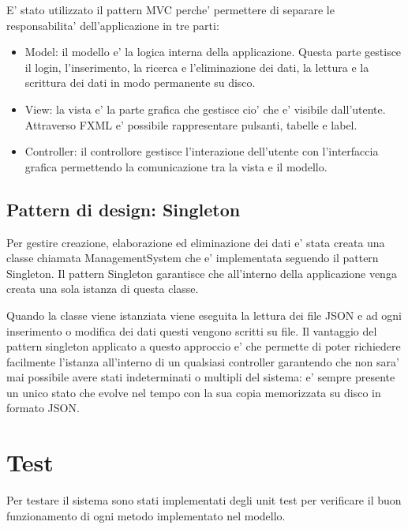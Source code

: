 \documentclass[ 4paper,11pt,openany]{book}
\begin{document}
E' stato utilizzato il pattern MVC perche' permettere di separare le responsabilita' dell'applicazione in tre parti:
\begin{itemize}
    \item Model: il modello e' la logica interna della applicazione. Questa parte gestisce il login, l'inserimento, la ricerca e l'eliminazione dei dati, la lettura e la scrittura dei dati in modo permanente su disco.
    \item View: la vista e' la parte grafica che gestisce cio' che e' visibile dall'utente. Attraverso FXML e' possibile rappresentare pulsanti, tabelle e label.
    \item Controller: il controllore gestisce l'interazione dell'utente con l'interfaccia grafica permettendo la comunicazione tra la vista e il modello.
\end{itemize}

\section{Pattern di design: Singleton}
Per gestire creazione, elaborazione ed eliminazione dei dati e' stata creata una classe chiamata ManagementSystem che e' implementata seguendo il pattern Singleton.
Il pattern Singleton garantisce che all'interno della applicazione venga creata una sola istanza di questa classe.

Quando la classe viene istanziata viene eseguita la lettura dei file JSON e ad ogni inserimento o modifica dei dati questi vengono scritti su file.
Il vantaggio del pattern singleton applicato a questo approccio e' che permette di poter richiedere facilmente l'istanza all'interno di un qualsiasi controller garantendo che non sara' mai possibile avere stati indeterminati o multipli del sistema: e' sempre presente un unico stato che evolve nel tempo con la sua copia memorizzata su disco in formato JSON.

\chapter{Test}
Per testare il sistema sono stati implementati degli unit test per verificare il buon funzionamento di ogni metodo implementato nel modello.
\end{document}
